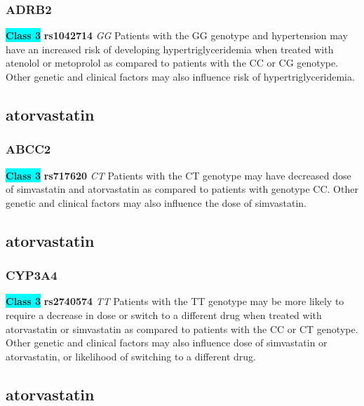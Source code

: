 \documentclass{book}
\begin{document}
\subsubsection{ ADRB2 }

\begin{center}
\textbf{\colorbox{cyan} {Class 3}} \textbf{ rs1042714 } \textit{ GG }
Patients with the GG genotype and hypertension may have an increased risk of developing hypertriglyceridemia when treated with atenolol or metoprolol as compared to patients with the CC or CG genotype. Other genetic and clinical factors may also influence risk of hypertriglyceridemia. 


\end{center}\subsection{ atorvastatin }


\subsubsection{ ABCC2 }

\begin{center}
\textbf{\colorbox{cyan} {Class 3}} \textbf{ rs717620 } \textit{ CT }
Patients with the CT genotype may have decreased dose of simvastatin and atorvastatin as compared to patients with genotype CC. Other genetic and clinical factors may also influence the dose of simvastatin.


\end{center}\subsection{ atorvastatin }


\subsubsection{ CYP3A4 }

\begin{center}
\textbf{\colorbox{cyan} {Class 3}} \textbf{ rs2740574 } \textit{ TT }
Patients with the TT genotype may be more likely to require a decrease in dose or switch to a different drug when treated with atorvastatin or simvastatin as compared to patients with the CC or CT genotype. Other genetic and clinical factors may also influence dose of simvastatin or atorvastatin, or likelihood of switching to a different drug.


\end{center}\subsection{ atorvastatin }
\end{document}
